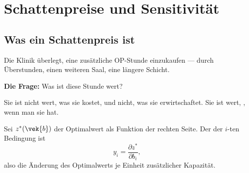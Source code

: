 \chapter{Schattenpreise und Sensitivität}

\section{Was ein Schattenpreis ist}

\begin{merksatz}
Die Klinik überlegt, eine zusätzliche OP-Stunde einzukaufen --- durch Überstunden, einen weiteren Saal, eine längere Schicht.

\textbf{Die Frage:} Was ist diese Stunde wert?

\begin{center}
\begin{minipage}{0.9\textwidth}
Sie ist nicht wert, was sie kostet, und nicht, was sie erwirtschaftet. Sie ist wert, , wenn man sie hat.
\end{minipage}
\end{center}

\begin{center}
\begin{minipage}{0.88\textwidth}
\end{minipage}
\end{center}
\end{merksatz}

\begin{definition}
Sei $z^{*}(\vek{b})$ der Optimalwert als Funktion der rechten Seite. Der  der $i$-ten Bedingung ist
\[ y_i = \frac{\partial z^{*}}{\partial b_i} , \]
also die Änderung des Optimalwerts je Einheit zusätzlicher Kapazität.
\end{definition}

